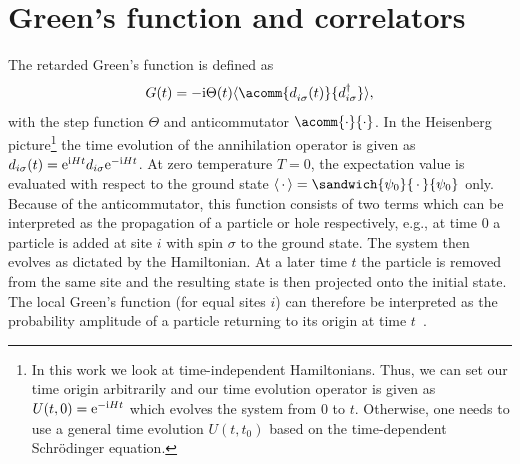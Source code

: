 \section{Green's function and correlators}

The retarded Green's function is defined as~\cite{Economou2006}
\begin{equation}
    G(t) = -\mi \Theta(t) \expval{\acomm{d^{\pdag}_{i\sigma}(t)}{d^\dag_{i\sigma}}},
\end{equation}
with the step function $\Theta$ and anticommutator $\acomm{\cdot}{\cdot}$.
In the Heisenberg picture\footnote{
    In this work we look at time-independent Hamiltonians.
    Thus, we can set our time origin arbitrarily and
    our time evolution operator is given as $U(t, 0) = \mathrm{e}^{-\mathrm{i} H t}$
    which evolves the system from $0$ to $t$.
    Otherwise, one needs to use a general time evolution $U(t, t_0)$
    based on the time-dependent Schrödinger equation.
}
the time evolution of the annihilation operator is given as
$d_{i\sigma}(t) = \mathrm{e}^{\mathrm{i} H t} d_{i\sigma} \mathrm{e}^{-\mathrm{i} H t}$.
At zero temperature $T=0$, the expectation value is evaluated with respect to the ground state
$\expval{\,\cdot\,} = \sandwich{\psi_0}{\,\cdot\,}{\psi_0}$ only.
Because of the anticommutator,
this function consists of two terms which can be interpreted as
the propagation of a particle or hole respectively,
e.g., at time $0$ a particle is added at site $i$ with spin $\sigma$ to the ground state.
The system then evolves as dictated by the Hamiltonian.
At a later time $t$ the particle is removed from the same site and
the resulting state is then projected onto the initial state.
The local Green's function (for equal sites $i$) can therefore be interpreted as
the probability amplitude of a particle returning to its origin at time $t$~\cite{Economou2006}.

